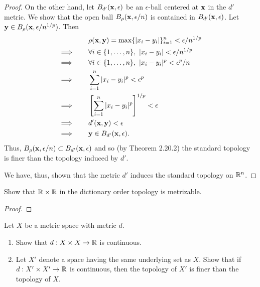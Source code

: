 \begin{solution}
\begin{proof}
        On the other hand, let $B_{d'}(\mathbf{x}, \epsilon)$ be an $\epsilon$-ball centered at $\mathbf{x}$ in the $d'$ metric.
        We show that the open ball $B_\rho(\mathbf{x}, \epsilon/n)$ is contained in $B_{d'}(\mathbf{x}, \epsilon)$.
        Let $\mathbf{y} \in B_\rho(\mathbf{x}, \epsilon/n^{1/p})$.
        Then
        \begin{align*}
                            & \rho(\mathbf{x}, \mathbf{y})  = \max\{|x_i - y_i|\}_{i=1}^n < \epsilon / n^{1/p} \\
            \implies\qquad  & \forall i \in \{1, \ldots, n\},~ |x_i - y_i| < \epsilon / n^{1/p} \\
            \implies\qquad  & \forall i \in \{1, \ldots, n\},~ |x_i - y_i|^p < \epsilon^p / n \\
            \implies\qquad  & \sum_{i=1}^n |x_i - y_i|^p < \epsilon^p \\
            \implies\qquad  & \left[\sum_{i=1}^n |x_i - y_i|^p\right]^{1/p} < \epsilon \\
            \implies\qquad  & d'(\mathbf{x}, \mathbf{y}) < \epsilon \\
            \implies\qquad  & \mathbf{y} \in B_{d'}(\mathbf{x}, \epsilon).
        \end{align*}
        Thus, $B_\rho(\mathbf{x}, \epsilon / n) \subset B_{d'}(\mathbf{x}, \epsilon)$ and so (by Theorem 2.20.2) the standard topology is finer than the topology induced by $d'$.

        We have, thus, shown that the metric $d'$ induces the standard topology on $\mathbb{R}^n$.
    \end{proof}
\end{solution}
\newpage

\begin{exercise}[ID=2.20.2]
    Show that $\mathbb{R} \times \mathbb{R}$ in the dictionary order topology is metrizable.
\end{exercise}

\begin{solution}
    \begin{proof}
    \end{proof}
\end{solution}
\newpage

\begin{exercise}[ID=2.20.3]
    Let $X$ be a metric space with metric $d$.
    \begin{enumerate}[label={(\alph*)}, align=left, leftmargin=\parindent, listparindent=\parindent, labelwidth=0pt, itemindent=!]
        \item Show that $d: X \times X \rightarrow \mathbb{R}$ is continuous.
        \item Let $X'$ denote a space having the same underlying set as $X$.
        Show that if $d: X' \times X' \rightarrow \mathbb{R}$ is continuous, then the topology of $X'$ is finer than the topology of $X$.
    \end{enumerate}
\end{exercise}

